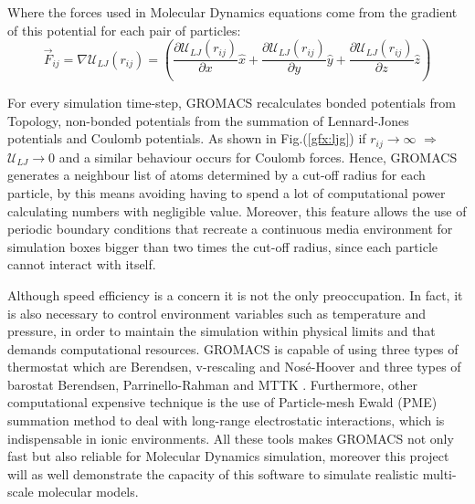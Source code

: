 \documentclass[10pt,a4paper,twoside]{article}
\begin{document}
Where the forces used in Molecular Dynamics equations come from the gradient of this potential for each pair of particles:
\begin{equation}
\vec{F}_{ij} = \nabla\mathcal{U}_{LJ}(r_{ij}) = \left( \dfrac{\partial\mathcal{U}_{LJ}(r_{ij})}{\partial x}\hat{x} + \dfrac{\partial\mathcal{U}_{LJ}(r_{ij})}{\partial y}\hat{y}+\dfrac{\partial\mathcal{U}_{LJ}(r_{ij})}{\partial z}\hat{z}\right) 
\label{eqn:ljf}
\end{equation}

For every simulation time-step, GROMACS recalculates bonded potentials from Topology, non-bonded potentials from the summation of Lennard-Jones potentials and Coulomb potentials. As shown in Fig.(\ref{gfx:ljg}) if $r_{ij} \rightarrow \infty$ $\Rightarrow$ $\mathcal{U}_{LJ} \rightarrow 0$ and a similar behaviour occurs for Coulomb forces. Hence, GROMACS generates a neighbour list of atoms determined by a cut-off radius for each particle, by this means avoiding having to spend a lot of computational power calculating numbers with negligible value. Moreover, this feature allows the use of periodic boundary conditions that recreate a continuous media environment for simulation boxes bigger than  two times the cut-off radius, since each particle cannot interact with itself. 

Although speed efficiency is a concern it is not the only preoccupation. In fact, it is also necessary to control environment variables such as temperature and pressure, in order to maintain the simulation within physical limits and that demands computational resources. GROMACS is capable of using three types of thermostat which are Berendsen, v-rescaling and Nosé-Hoover and three types of barostat Berendsen, Parrinello-Rahman and MTTK \cite{gromanual}. Furthermore, other computational expensive technique is the use of Particle-mesh Ewald (PME) summation method \cite{ewald} to deal with long-range electrostatic interactions, which is indispensable in ionic environments. All these tools makes GROMACS not only fast but also reliable for Molecular Dynamics simulation, moreover this project will as well demonstrate the capacity of this software to simulate realistic multi-scale molecular models.
  
\end{document}
